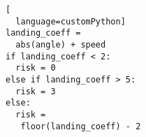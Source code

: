 \begin{lstlisting}[
  language=customPython]
landing_coeff =
  abs(angle) + speed
if landing_coeff < 2:
  risk = 0
else if landing_coeff > 5:
  risk = 3
else:
  risk =
   floor(landing_coeff) - 2
\end{lstlisting}
